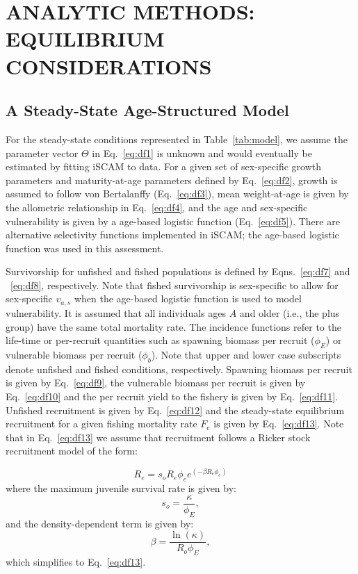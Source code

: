 \section{ANALYTIC METHODS: EQUILIBRIUM CONSIDERATIONS}

\subsection{A Steady-State Age-Structured Model}

For the steady-state conditions represented in Table~\ref{tab:model}, we assume the parameter vector $\Theta$ in Eq.~\ref{eq:df1} is unknown and would eventually be estimated by fitting iSCAM to data. For a given set of sex-specific growth parameters and maturity-at-age parameters defined by Eq.~\ref{eq:df2}, growth is assumed to follow von Bertalanffy (Eq.~\ref{eq:df3}), mean weight-at-age is given by the allometric relationship in Eq.~\ref{eq:df4}, and the age and sex-specific vulnerability is given by a age-based logistic function (Eq.~\ref{eq:df5}). There are alternative selectivity functions implemented in iSCAM; the age-based logistic function was used in this assessment.

Survivorship for unfished and fished populations is defined by Eqns.~\ref{eq:df7} and ~\ref{eq:df8}, respectively. Note that fished survivorship is sex-specific to allow for sex-specific $v_{a,s}$ when the age-based logistic function is used to model vulnerability. It is assumed that all individuals ages $A$ and older (i.e., the plus group) have the same total mortality rate. The incidence functions refer to the life-time or per-recruit quantities such as spawning biomass per recruit ($\phi_E$) or vulnerable biomass per recruit ($\phi_b$). Note that upper and lower case subscripts denote unfished and fished conditions, respectively. Spawning biomass per recruit is given by Eq.~\ref{eq:df9}, the vulnerable biomass per recruit is given by Eq.~\ref{eq:df10} and the per recruit yield to the fishery is given by Eq.~\ref{eq:df11}. Unfished recruitment is given by Eq.~\ref{eq:df12} and the steady-state equilibrium recruitment for a given fishing mortality rate $F_e$ is given by Eq.~\ref{eq:df13}. Note that in Eq.~\ref{eq:df13} we assume that recruitment follows a Ricker stock recruitment model of the form:

\[R_e=s_o R_e \phi_e e^{(-\beta R_e \phi_e)}\]
where the maximum juvenile survival rate is given by:
\[s_o=\frac{\kappa}{\phi_E},\]
and the density-dependent term is given by:
\[\beta=\frac{\ln\left(\kappa\right)}{R_{{o}}\phi_{{E}}},\]
which simplifies to Eq.~\ref{eq:df13}.

